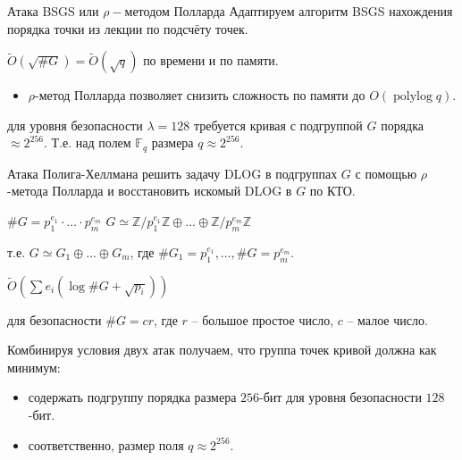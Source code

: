 \documentclass{beamer}
\begin{document}
\begin{frame}{Атака BSGS или $\rho-$методом Полларда}
        Адаптируем алгоритм BSGS нахождения порядка точки из лекции по подсчёту точек.
    
     $\widetilde{O}(\sqrt{\#G}) = \widetilde{O}(\sqrt{q})$ по времени и по памяти.
    \begin{itemize}
        \item $\rho$-метод Полларда позволяет снизить сложность по памяти до $O(\operatorname{polylog} q)$.
    \end{itemize}
     для уровня безопасности $\lambda = 128$ требуется кривая с подгруппой $G$ порядка $\approx 2^{256}$. Т.е. над полем $\mathbb{F}_q$ размера $q \approx 2^{256}$.
\end{frame}

\begin{frame}{Атака Полига-Хеллмана}
     решить задачу DLOG в подгруппах $G$ с помощью $\rho$-метода Полларда и восстановить искомый DLOG в $G$ по КТО.
    \begin{center}
        $\#G = p_1^{e_1} \cdot \ldots \cdot p_m^{e_m}$ \structure{$\implies$} $G \simeq \mathbb{Z} / p_1^{e_1} \mathbb{Z} \oplus \ldots \oplus \mathbb{Z} / p_m^{e_m} \mathbb{Z}$
    \end{center}
    
        т.е. $G \simeq G_1 \oplus ... \oplus G_m$, где $\#G_1 = p_1^{e_1}, \ldots, \#G = p_m^{e_m}$.
    
     $\widetilde{O}(\sum e_i (\log{\#G} + \sqrt{p_i}))$
    
    \begin{center}
        \structure{$\Downarrow$}
    \end{center}
    
     для безопасности $\#G = c r$, где $r$ -- большое простое число, $c$ -- малое число.
\end{frame}

\begin{frame}
    Комбинируя условия двух атак получаем, что группа точек кривой должна как минимум:
\begin{itemize}
    \item содержать подгруппу  порядка размера $256$-бит для уровня безопасности $128$-бит.
    \item соответственно, размер поля $q \approx 2^{256}$.
\end{itemize} 
\end{frame}
\end{document}

